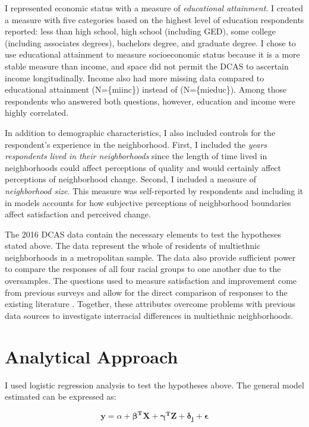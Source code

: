 \documentclass{baderart}
\renewcommand{\needcite}[1][]{%
	\strong{[CITE: %
		\ifthenelse{\equal{#1}{}}{}{: #1}	%
	]}}
\begin{document}
I represented economic status with a measure of \emph{educational attainment}. I created a measure with five categories based on the highest level of education respondents reported: less than high school, high school (including GED), some college (including associates degrees), bachelors degree, and graduate degree. I chose to use educational attainment to measure socioeconomic status because it is a more stable measure than income, and space did not permit the DCAS to ascertain income longitudinally. Income also had more missing data compared to educational attainment (N=\{miinc\}) instead of (N=\{mieduc\}). Among those respondents who answered both questions, however, education and income were highly correlated.

In addition to demographic characteristics, I also included controls for the respondent's experience in the neighborhood. First, I included the \emph{years respondents lived in their neighborhoods} since the length of time lived in neighborhoods could affect perceptions of quality and would certainly affect perceptions of neighborhood change. Second, I included a measure of \emph{neighborhood size}. This measure was self-reported by respondents and including it in models accounts for how subjective perceptions of neighborhood boundaries affect satisfaction and perceived change.

The 2016 DCAS data contain the necessary elements to test the hypotheses stated above. The data represent the whole of residents of multiethnic neighborhoods in a metropolitan sample. The data also provide sufficient power to compare the responses of all four racial groups to one another due to the oversamples. The questions used to measure satisfaction and improvement come from previous surveys and allow for the direct comparison of responses to the existing literature\needcite. Together, these attributes overcome problems with previous data sources to investigate interracial differences in multiethnic neighborhoods.

\section{Analytical Approach}\label{analytical-approach}

I used logistic regression analysis to test the hypotheses above. The general model estimated can be expressed as:

\[\mathbf{y} = \alpha + \mathbf{\beta^T X} + \mathbf{\gamma^T Z} + \mathbf{\delta_j} + \mathbf{\epsilon}\]
\end{document}
